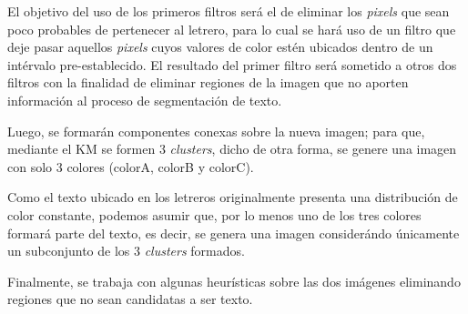 El objetivo del uso de los primeros filtros será el de eliminar los 
\textit{pixels} que sean poco probables de pertenecer al letrero, para lo cual
se hará uso de un filtro que deje pasar aquellos \textit{pixels} cuyos valores
de color estén ubicados dentro de un intérvalo pre-establecido. El resultado del
primer filtro será sometido a otros dos filtros con la finalidad de eliminar
regiones de la imagen que no aporten información al proceso de segmentación de
texto.

Luego, se formarán componentes conexas sobre la nueva imagen; para que, 
mediante el KM se formen 3 \textit{clusters}, dicho de otra forma, se genere 
una imagen con solo 3 colores (colorA, colorB y colorC).

Como el texto ubicado en los letreros originalmente presenta una distribución 
de color constante, podemos asumir que, por lo menos uno de los tres colores
formará parte del texto, es decir, se genera una imagen considerándo únicamente
un subconjunto de los 3 \textit{clusters} formados.

Finalmente, se trabaja con algunas heurísticas sobre las dos imágenes 
eliminando regiones que no sean candidatas a ser texto.
